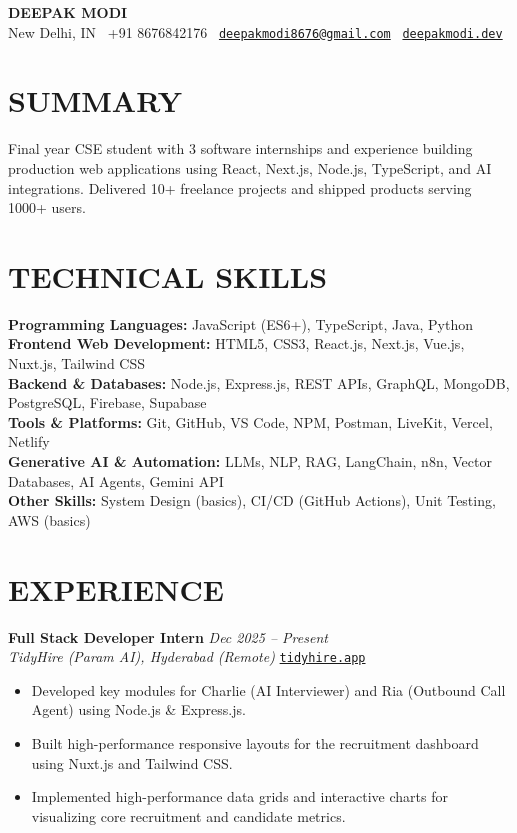 \documentclass[a4paper,11pt]{article}
\begin{document}
\small

\begin{center}
    {\huge \textbf{DEEPAK MODI}}\\[6pt]
    New Delhi, IN \textbar\ +91 8676842176 \textbar\
    \href{mailto:deepakmodi8676@gmail.com}{\nolinkurl{deepakmodi8676@gmail.com}} \textbar\
    \href{https://deepakmodi.dev}{\texttt{deepakmodi.dev}}
\end{center}

\section*{SUMMARY}
Final year CSE student with 3 software internships and experience building production web applications using React, Next.js, Node.js, TypeScript, and AI integrations. Delivered 10+ freelance projects and shipped products serving 1000+ users.

\section*{TECHNICAL SKILLS}
\textbf{Programming Languages:} JavaScript (ES6+), TypeScript, Java, Python\\
\textbf{Frontend Web Development:} HTML5, CSS3, React.js, Next.js, Vue.js, Nuxt.js, Tailwind CSS\\
\textbf{Backend \& Databases:} Node.js, Express.js, REST APIs, GraphQL, MongoDB, PostgreSQL, Firebase, Supabase\\
\textbf{Tools \& Platforms:} Git, GitHub, VS Code, NPM, Postman, LiveKit, Vercel, Netlify\\
\textbf{Generative AI \& Automation:} LLMs, NLP, RAG, LangChain, n8n, Vector Databases, AI Agents, Gemini API\\
\textbf{Other Skills:} System Design (basics), CI/CD (GitHub Actions), Unit Testing, AWS (basics)

\section*{EXPERIENCE}

\textbf{Full Stack Developer Intern} \hfill \textit{Dec 2025 -- Present}\\
\textit{TidyHire (Param AI), Hyderabad (Remote)} \hfill \href{https://tidyhire.app}{\texttt{tidyhire.app}}
\begin{itemize}
    \item Developed key modules for Charlie (AI Interviewer) and Ria (Outbound Call Agent) using Node.js \& Express.js.
    \item Built high-performance responsive layouts for the recruitment dashboard using Nuxt.js and Tailwind CSS.
    \item Implemented high-performance data grids and interactive charts for visualizing core recruitment and candidate metrics.
\end{itemize}
\end{document}
